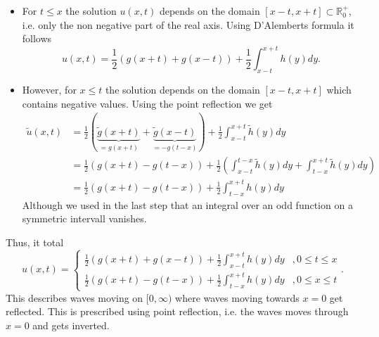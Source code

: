 \documentclass[A4,12pt,twoside]{book}
\begin{document}
\begin{itemize}
    \item For $t \leq x$ the solution $u(x,t)$ depends on the domain $[x-t,x+t] \subset \mathbb{R}^+_0$, i.e. only the non negative part of the real axis. Using D'Alemberts formula it follows 
    \[
    u(x,t)= \frac{1}{2} (g(x+t) + g(x-t)) + \frac{1}{2} \int_{x-t}^{x+t} h(y) dy.
    \]
    \item However, for $x \leq t$ the solution depends on the domain $[x-t,x+t]$ which contains negative values. Using the point reflection we get
    \begin{align*}
        \tilde{u}(x,t) &= \frac{1}{2} ( \underbrace{\tilde{g}(x+t)}_{=g(x+t)} + \underbrace{\tilde{g}(x-t)}_{=-g(t-x)}) + \frac{1}{2} \int_{x-t}^{x+t} \tilde{h}(y) dy \\
        &= \frac{1}{2} ( g(x+t) - g(t-x)) + \frac{1}{2} \left( \int_{x-t}^{t-x} \tilde{h}(y) dy+ \int_{t-x}^{x+t} \tilde{h}(y) dy  \right) \\
        &= \frac{1}{2} ( g(x+t) - g(t-x)) + \frac{1}{2}  \int_{t-x}^{x+t} h(y) dy 
    \end{align*}
    Although we used in the last step that an integral over an odd function on a symmetric intervall vanishes.
\end{itemize}
Thus, it total 
\[
u(x,t) = \begin{cases}
    \frac{1}{2} (g(x+t) + g(x-t)) + \frac{1}{2} \int_{x-t}^{x+t} h(y) dy &, 0\leq t \leq x \\
    \frac{1}{2} ( g(x+t) - g(t-x)) + \frac{1}{2}  \int_{t-x}^{x+t} h(y) dy &,0 \leq x \leq t
\end{cases}.
\]
This describes waves moving on $[0,\infty)$ where waves moving towards $x=0$ get reflected. This is prescribed using point reflection, i.e. the waves moves through $x=0$ and gets inverted.

\end{document}
